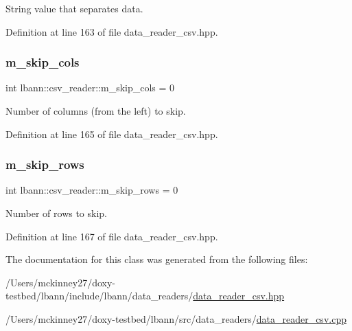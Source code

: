 String value that separates data. 



Definition at line 163 of file data\+\_\+reader\+\_\+csv.\+hpp.

\mbox{\label{classlbann_1_1csv__reader_a3a6cb698fbeb4abd0032e2b018bbb326}} 
\subsubsection{\texorpdfstring{m\+\_\+skip\+\_\+cols}{m\_skip\_cols}}
{\footnotesize\ttfamily int lbann\+::csv\+\_\+reader\+::m\+\_\+skip\+\_\+cols = 0\hspace{0.3cm}{\ttfamily [protected]}}



Number of columns (from the left) to skip. 



Definition at line 165 of file data\+\_\+reader\+\_\+csv.\+hpp.

\mbox{\label{classlbann_1_1csv__reader_a52b9eebd06309a8d8858ce74ecd8cce0}} 
\subsubsection{\texorpdfstring{m\+\_\+skip\+\_\+rows}{m\_skip\_rows}}
{\footnotesize\ttfamily int lbann\+::csv\+\_\+reader\+::m\+\_\+skip\+\_\+rows = 0\hspace{0.3cm}{\ttfamily [protected]}}



Number of rows to skip. 



Definition at line 167 of file data\+\_\+reader\+\_\+csv.\+hpp.



The documentation for this class was generated from the following files\+:\begin{DoxyCompactItemize}
\item 
/\+Users/mckinney27/doxy-\/testbed/lbann/include/lbann/data\+\_\+readers/\hyperlink{data__reader__csv_8hpp}{data\+\_\+reader\+\_\+csv.\+hpp}\item 
/\+Users/mckinney27/doxy-\/testbed/lbann/src/data\+\_\+readers/\hyperlink{data__reader__csv_8cpp}{data\+\_\+reader\+\_\+csv.\+cpp}\end{DoxyCompactItemize}
